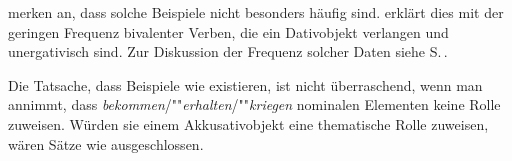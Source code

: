 \noindent
\citet{HW95a} merken an, dass solche Beispiele nicht besonders häufig sind.
\citet[]{Wegener90} erklärt dies mit der geringen Frequenz bivalenter
Verben, die ein Dativobjekt verlangen und unergativisch sind. Zur Diskussion der Frequenz
solcher Daten siehe S.\,\pageref{frequenz-von-korpusbelegen}.


Die Tatsache, dass Beispiele wie  
existieren, ist nicht überraschend, wenn man annimmt, dass
\emph{bekommen}/""\emph{erhalten}/""\emph{kriegen} nominalen Elementen keine Rolle
zuweisen. Würden sie einem Akkusativobjekt eine thematische Rolle zuweisen,
wären Sätze wie  ausgeschlossen.


